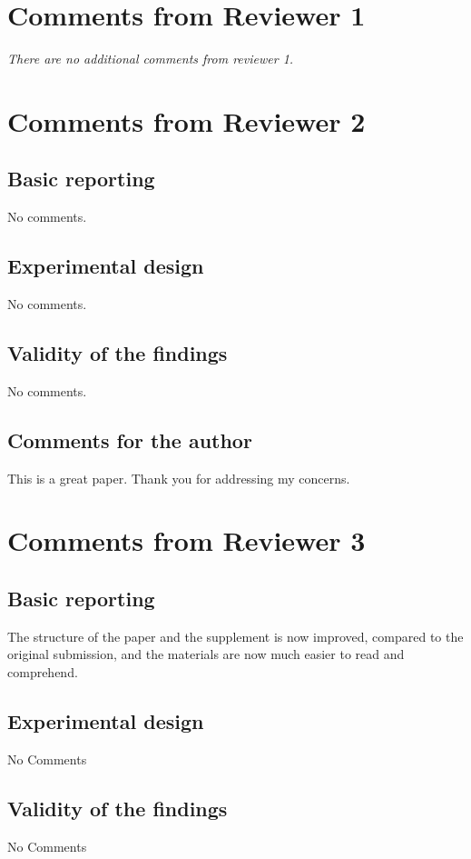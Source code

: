 \documentclass[answers,12pt]{exam}
\begin{document}
\section{Comments from Reviewer 1}
\emph{There are no additional comments from reviewer 1.}


\section{Comments from Reviewer 2}
\subsection{Basic reporting}
No comments.

\subsection{Experimental design}
No comments.

\subsection{Validity of the findings}
No comments.

\subsection{Comments for the author}
This is a great paper. Thank you for addressing my concerns.

\section{Comments from Reviewer 3}
\subsection{Basic reporting}
The structure of the paper and the supplement is now improved, compared to the original submission, and the materials are now much easier to read and comprehend.

\subsection{Experimental design}
No Comments

\subsection{Validity of the findings}
No Comments
\end{document}
